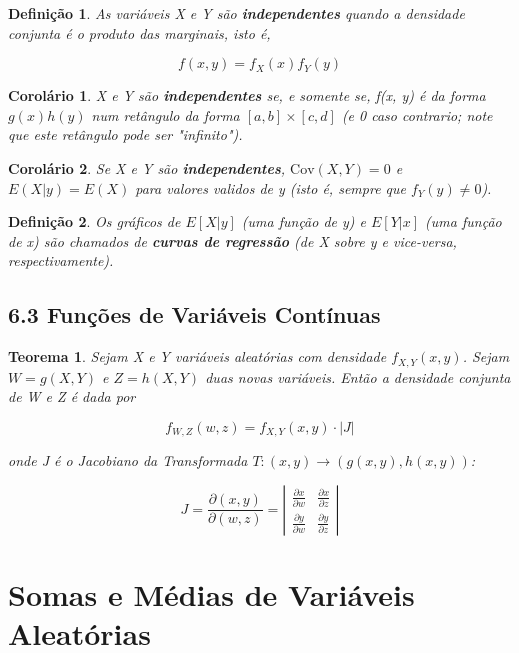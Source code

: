 \documentclass[12pt]{article}
\newtheorem{theorem}{Teorema}[section]
\newtheorem{corollary}{Corolário}[theorem]
\newtheorem{definition}{Definição}
\begin{document}
\begin{definition}
    As variáveis X e Y são \textbf{independentes} quando a densidade conjunta é o produto das marginais, isto é,
    
    $$f(x, y) = f_X (x) f_Y (y)$$
\end{definition}

\begin{corollary}
    X e Y são \textbf{independentes} se, e somente se, f(x, y) é da forma $g(x) h(y)$ num retângulo da forma $[a, b] \times [c, d]$ (e 0 caso contrario; note que este retângulo pode ser "infinito").
\end{corollary}

\begin{corollary}
    Se X e Y são \textbf{independentes}, $\text{Cov} (X, Y) = 0$ e $E(X | y) = E(X)$ para valores validos de y (isto é, sempre que $f_Y (y) \neq 0$).
\end{corollary}

\begin{definition}
    Os gráficos de $E[X|y]$ (uma função de y) e $E[Y|x]$ (uma função de x) são chamados de \textbf{curvas de regressão} (de X sobre y e vice-versa, respectivamente).
\end{definition}

\subsection*{6.3 Funções de Variáveis Contínuas}
\begin{theorem}
    Sejam X e Y variáveis aleatórias com densidade $f_{X, Y} (x, y)$. Sejam $W = g(X, Y)$ e $Z = h(X, Y)$ duas novas variáveis. Então a densidade conjunta de W e Z é dada por
    
    $$f_{W,Z} (w, z) = f_{X, Y} (x, y) \cdot |J|$$
    
    onde J é o Jacobiano da Transformada $T : (x, y) \rightarrow{} (g(x, y), h(x, y))$:
    
    $$J = \frac{\partial (x,y)}{\partial (w, z)} = \left | \begin{array}{cc}
        \frac{\partial x}{\partial w} & \frac{\partial x}{\partial z} \\
        \frac{\partial y}{\partial w} & \frac{\partial y}{\partial z}
    \end{array} \right |$$
\end{theorem}

\section{Somas e Médias de Variáveis Aleatórias}
\end{document}
